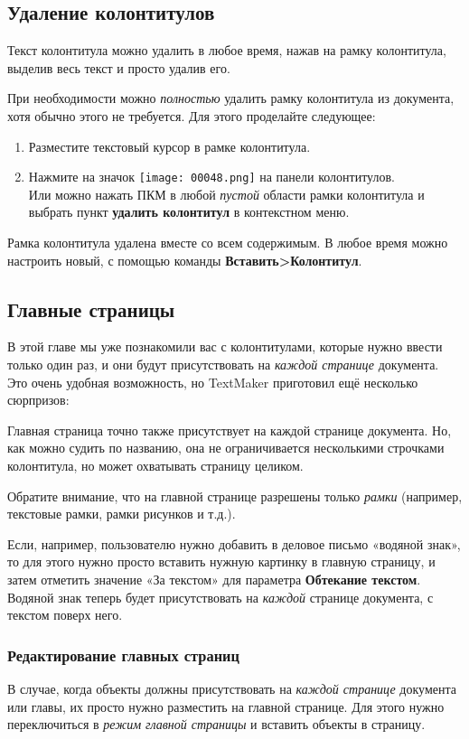 ﻿\documentclass[a4paper,10pt]{article}
\begin{document}
\subsection{Удаление колонтитулов}
Текст колонтитула можно удалить в любое время, нажав на рамку колонтитула, выделив весь текст и просто удалив его.

При необходимости можно \textit{полностью} удалить рамку колонтитула из документа, хотя обычно этого не требуется. Для этого проделайте следующее:
\begin{enumerate}
 \item Разместите текстовый курсор в рамке колонтитула.
 \item Нажмите на значок \texttt{[image: 00048.png]} на панели колонтитулов.\\
 Или можно нажать ПКМ в любой \textit{пустой} области рамки колонтитула и выбрать пункт \textbf{удалить колонтитул} в контекстном меню.
\end{enumerate}

Рамка колонтитула удалена вместе со всем содержимым. В любое время можно настроить новый, с помощью команды \textbf{Вставить>Колонтитул}.

\subsection{Главные страницы} \label{sec:главнстраницы}
В этой главе мы уже познакомили вас с колонтитулами, которые нужно ввести только один раз, и они будут присутствовать на \textit{каждой странице} документа. Это очень удобная возможность, но TextMaker приготовил ещё несколько сюрпризов:

Главная страница точно также присутствует на каждой странице документа. Но, как можно судить по названию, она не ограничивается несколькими строчками колонтитула, но может охватывать страницу целиком.

Обратите внимание, что на главной странице разрешены только \textit{рамки} (например, текстовые рамки, рамки рисунков и т.д.).

Если, например, пользователю нужно добавить в деловое письмо «водяной знак», то для этого нужно просто вставить нужную картинку в главную страницу, и затем отметить значение «За текстом» для параметра \textbf{Обтекание текстом}. Водяной знак теперь будет присутствовать на \textit{каждой} странице документа, с текстом поверх него.

\subsubsection{Редактирование главных страниц}
В случае, когда объекты должны присутствовать на \textit{каждой странице} документа или главы, их просто нужно разместить на главной странице. Для этого нужно переключиться в \textit{режим главной страницы} и вставить объекты в страницу.
\end{document}
